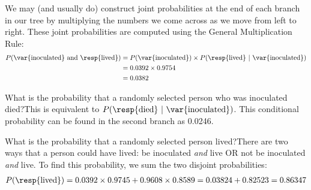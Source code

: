 We may (and usually do) construct joint probabilities at the end of each branch in our tree by multiplying the numbers we come across as we move from left to right. These joint probabilities are computed using the General Multiplication Rule:
\begin{align*}
P(\text{\var{inoculated} and \resp{lived}}) &= P(\text{\var{inoculated}})\times P(\text{\resp{lived}}\ |\ \text{\var{inoculated}}) \\
	&= 0.0392\times 0.9754 \\
	&=0.0382
\end{align*}

\begin{examplewrap}
\begin{nexample}{What is the probability that a randomly selected person who was inoculated died?}This is equivalent to $P(\text{\resp{died}}\ |\ \text{\var{inoculated}})$. This conditional probability can be found in the second branch as 0.0246.
\end{nexample}
\end{examplewrap}


\D{\newpage}

\begin{examplewrap}
\begin{nexample}{What is the probability that a randomly selected person lived?}There are two ways that a person could have lived:  be inoculated \emph{and} live OR not be inoculated \emph{and} live. To find this probability, we sum the two disjoint probabilities:
\begin{align*}
P(\text{\resp{lived}}) = 0.0392 \times 0.9745 + 0.9608 \times 0.8589 = 0.03824 + 0.82523 = 0.86347
\end{align*}
\end{nexample}
\end{examplewrap}


